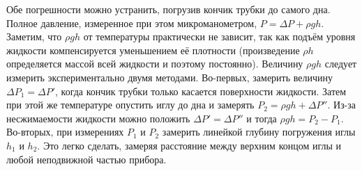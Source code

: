 \documentclass[12pt]{article}
\begin{document}
    Обе погрешности можно устранить, погрузив кончик трубки до самого дна.
    Полное давление, измеренное при этом микроманометром, $P=\Delta P+\rho g h$.
    Заметим, что $\rho g h$ от температуры практически не зависит, так как
    подъём уровня жидкости компенсируется уменьшением её плотности (произведение
    $\rho h$ определяется массой всей жидкости и поэтому постоянно). Величину
    $\rho g h$ следует измерить экспериментально двумя методами. Во-первых,
    замерить величину $\Delta P_1 = \Delta P'$, когда кончик трубки только
    касается поверхности жидкости. Затем при этой же температуре опустить иглу
    до дна и замерять $P_2 = \rho gh + \Delta P''$. Из-за несжимаемости
    жидкости можно положить $\Delta P' = \Delta P''$ и тогда $\rho gh = P_2 -
    P_1$. Во-вторых, при измерениях $P_1$ и $P_2$ замерить линейкой глубину
    погружения иглы $h_1$ и $h_2$. Это легко сделать, замеряя расстояние
    между верхним концом иглы и любой неподвижной частью прибора.
\end{document}
